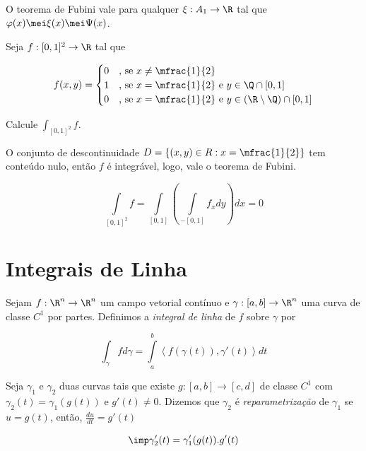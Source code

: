 \documentclass[11pt, oneside, a4paper]{gsm-l}
\begin{document}
\begin{cor}
  \begin{sloppypar}
   O teorema de Fubini vale para qualquer $\xi:A_1 \to \R$ tal que ${\varphi(x) \mei \xi(x) \mei \Psi(x)}$.
  \end{sloppypar}
\end{cor}

\begin{exem}
Seja $f:[0,1]^2 \to \R$ tal que

\begin{equation*}
  f(x,y) =
  \begin{cases}
    \hfill 0 	& \mbox{, se } x \ne \mfrac{1}{2} \\
    \hfill 1 	& \mbox{, se } x = \mfrac{1}{2} \mbox{ e } y \in \Q \cap [0,1] \\
    \hfill 0 	& \mbox{, se } x = \mfrac{1}{2} \mbox{ e } y \in (\R \setminus \Q) \cap [0,1]
  \end{cases}
\end{equation*}

Calcule $\int_{[0,1]^2} f$.
\end{exem}

\begin{sol}


O conjunto de descontinuidade $D = \{ (x,y) \in R: x = \mfrac{1}{2} \}$ tem conte\'udo nulo, então $f$ é integrável, logo, vale o teorema de Fubini.

\[
\int\limits_{[0,1]^2 } f  = \int\limits_{[0,1]} {\left( {\int\limits_{ - [0,1]} {f_x dy} } \right)} dx = 0
\]

\end{sol}


\section{Integrais de Linha} \label{sec29}
\begin{defi}
Sejam $f:\R^n \to \R^n$ um campo vetorial contínuo e $\gamma :\left[ {a,b} \right] \to \R^n$ uma curva de classe $C^1$ por partes. Definimos a \textit{integral de linha} de $f$ sobre $\gamma$ por

\[
\int_\gamma  f d\gamma  = \int\limits_a^b {\left\langle {f\left( {\gamma \left( t \right)} \right),\gamma '\left( t \right)} \right\rangle dt}
\]
\end{defi}

\begin{defi}
Seja $\gamma_1$ e $\gamma_2$ duas curvas tais que existe $g:[a,b] \to [c,d]$ de classe $C^1$ com $\gamma_2 (t) = \gamma_1 (g(t))$ e $g'(t) \ne 0$. Dizemos que $\gamma_2$ é \textit{reparametrização} de $\gamma_1$ se $u = g(t)$, então, $\frac{du}{dt} = g'(t)$

\[
\imp \gamma_2 ' (t) = \gamma_1 ' (g(t)).g'(t)
\]
\end{defi}
\end{document}
